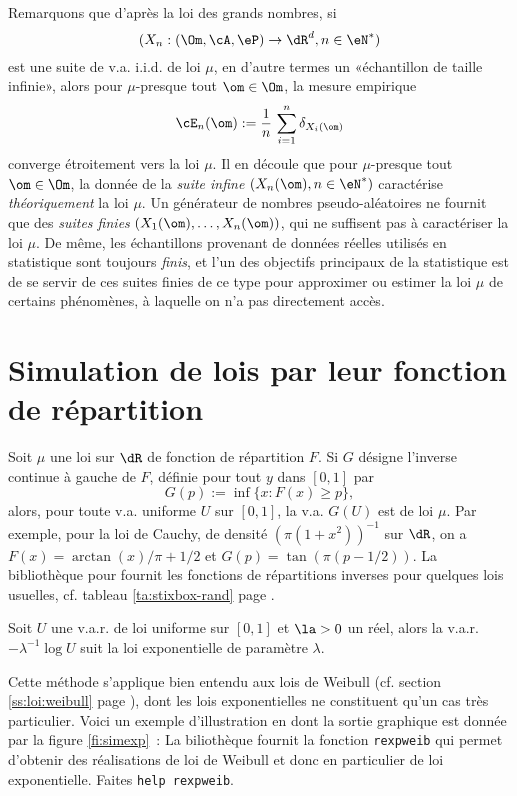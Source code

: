 \begin{rem}
  Remarquons que d'après la loi des grands nombres, si
  $$(X_n:(\Om,\cA,\eP)\to\dR^d,n\in\eN^*)$$
  est une suite de v.a. i.i.d. de loi
  $\mu$, en d'autre termes un «échantillon de taille infinie»,
  alors pour $\mu$-presque tout $\om\in\Om$, la mesure empirique
  $$
  \cE_n(\om):=\frac{1}{n}\,\sum_{i=1}^n \delta_{X_i(\om)}
  $$
  converge étroitement vers la loi $\mu$. Il en découle que pour $\mu$-presque
  tout $\om\in\Om$, la donnée de la \emph{suite infine} $(X_n(\om),n\in\eN^*)$
  caractérise \emph{théoriquement} la loi $\mu$. 
  Un générateur de nombres pseudo-aléatoires ne
  fournit que des \emph{suites finies} $(X_1(\om),\ldots,X_n(\om))$, qui ne
  suffisent pas à caractériser la loi $\mu$. De même,
  les échantillons provenant de données réelles utilisés en statistique sont 
  toujours \emph{finis}, et
  l'un des objectifs principaux de la statistique est de se servir de ces
  suites finies de ce type pour approximer ou estimer la loi $\mu$ de certains
  phénomènes, à laquelle on n'a pas directement accès.
\end{rem}

%
\section{Simulation de lois par leur fonction de répartition}
%

Soit $\mu$ une loi sur $\dR$ de fonction de répartition $F$. Si $G$ désigne
l'inverse continue à gauche de $F$, définie pour tout $y$ dans $[0,1]$ par
$$
G(p):=\inf\{x:F(x)\geq p\},
$$
alors, pour toute v.a. uniforme $U$ sur $[0,1]$, la v.a. $G(U)$ est de loi
$\mu$. Par exemple, pour la loi de Cauchy, de densité $(\pi(1+x^2))^{-1}$ sur
$\dR$, on a $F(x)=\arctan(x)/\pi+1/2$ et $G(p)=\tan(\pi(p-1/2))$. La
bibliothèque \SB{} pour \ML{} fournit les fonctions de répartitions inverses
pour quelques lois usuelles, cf. tableau \ref{ta:stixbox-rand} page
\pageref{ta:stixbox-rand}.

\begin{thm}\label{th:simexp}
  Soit $U$ une v.a.r. de loi uniforme sur $[0,1]$ et $\la>0$ un réel, alors la
  v.a.r. $-\lambda^{-1} \log U$ suit la loi exponentielle de paramètre
  $\lambda$.
\end{thm}
Cette méthode s'applique bien entendu aux lois de Weibull (cf. section
\ref{ss:loi:weibull} page \pageref{ss:loi:weibull}), dont les lois
exponentielles ne constituent qu'un cas très particulier. Voici un exemple
d'illustration en \ML{} dont la sortie graphique est donnée par la figure
\ref{fi:simexp}~:
%
%
%
La biliothèque \SB{} fournit la fonction \texttt{rexpweib} qui permet
d'obtenir des réalisations de loi de Weibull et donc en particulier de loi
exponentielle. Faites \texttt{help rexpweib}.
 

